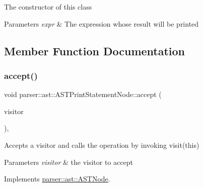 The constructor of this class 
\begin{DoxyParams}{Parameters}
{\em expr} & The expression whose result will be printed \\
\hline
\end{DoxyParams}


\subsection{Member Function Documentation}
\mbox{\label{classparser_1_1ast_1_1ASTPrintStatementNode_a15199624d689c55bd6d027132d2a9a64}} 
\subsubsection{\texorpdfstring{accept()}{accept()}}
{\footnotesize\ttfamily void parser\+::ast\+::\+A\+S\+T\+Print\+Statement\+Node\+::accept (\begin{DoxyParamCaption}\item[{\hyperlink{classvisitor_1_1Visitor}{visitor\+::\+Visitor} $\ast$}]{visitor }\end{DoxyParamCaption})\hspace{0.3cm}{\ttfamily [override]}, {\ttfamily [virtual]}}

Accepts a visitor and calls the operation by invoking {\ttfamily visit(this)} 
\begin{DoxyParams}{Parameters}
{\em visitor} & the visitor to accept \\
\hline
\end{DoxyParams}


Implements \hyperlink{classparser_1_1ast_1_1ASTNode_a3ff84fdfdbbc5c39b70b4d04c22e7dc3}{parser\+::ast\+::\+A\+S\+T\+Node}.

\mbox{\label{classparser_1_1ast_1_1ASTPrintStatementNode_a4e244a1d7f8c390c6772c2f2bab863a2}} 
